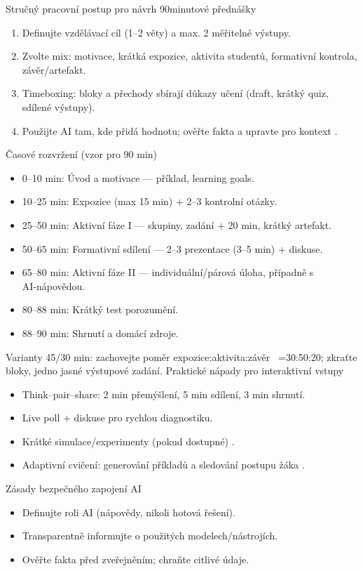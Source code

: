 \medskip
Stručný pracovní postup pro návrh 90minutové přednášky
\begin{enumerate}
\item Definujte vzdělávací cíl (1–2 věty) a max. 2 měřitelné výstupy.
\item Zvolte mix: motivace, krátká expozice, aktivita studentů, formativní kontrola, závěr/artefakt.
\item Timeboxing: bloky a přechody sbírají důkazy učení (draft, krátký quiz, sdílené výstupy).
\item Použijte AI tam, kde přidá hodnotu; ověřte fakta a upravte pro kontext \cite{kb_ai_101_tipu_pdf_04e4a115_page_51_1}.
\end{enumerate}
\medskip
Časové rozvržení (vzor pro 90 min)
\begin{itemize}
\item 0–10 min: Úvod a motivace — příklad, learning goals.
\item 10–25 min: Expozice (max 15 min) + 2–3 kontrolní otázky.
\item 25–50 min: Aktivní fáze I — skupiny, zadání + 20 min, krátký artefakt.
\item 50–65 min: Formativní sdílení — 2–3 prezentace (3–5 min) + diskuse.
\item 65–80 min: Aktivní fáze II — individuální/párová úloha, případně s AI‑nápovědou.
\item 80–88 min: Krátký test porozumění.
\item 88–90 min: Shrnutí a domácí zdroje.
\end{itemize}
Varianty 45/30 min: zachovejte poměr expozice:aktivita:závěr ~=30:50:20; zkraťte bloky, jedno jasné výstupové zadání.
\medskip
Praktické nápady pro interaktivní vstupy
\begin{itemize}
\item Think–pair–share: 2 min přemýšlení, 5 min sdílení, 3 min shrnutí.
\item Live poll + diskuse pro rychlou diagnostiku.
\item Krátké simulace/experimenty (pokud dostupné) \cite{kb_ai_101_tipu_pdf_04e4a115_page_15_2}.
\item Adaptivní cvičení: generování příkladů a sledování postupu žáka \cite{kb_ai_101_tipu_pdf_04e4a115_page_8_1}.
\end{itemize}
\medskip
Zásady bezpečného zapojení AI
\begin{itemize}
\item Definujte roli AI (nápovědy, nikoli hotová řešení).
\item Transparentně informujte o použitých modelech/nástrojích.
\item Ověřte fakta před zveřejněním; chraňte citlivé údaje.
\end{itemize}

